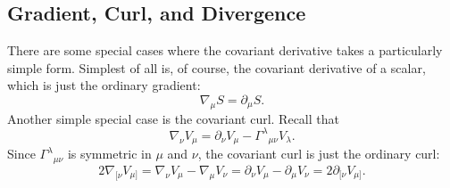 
\subsection{Gradient, Curl, and Divergence}\label{sec:4.7}

There are some special cases where the covariant derivative takes a
particularly simple form. Simplest of all is, of course, the covariant
derivative of a scalar, which is just the ordinary gradient:
\begin{equation}
  \nabla_\mu S=\partial_\mu S.
  \tag{4.7.1}\label{eq:4.7.1}
\end{equation}
Another simple special case is the covariant curl. Recall that
\[
  \nabla_\nu V_\mu
  =
  \partial_\nu V_\mu-\Gamma^\lambda{}_{\mu\nu}V_\lambda.
\]
Since \(\Gamma^\lambda{}_{\mu\nu}\) is symmetric in \(\mu\) and \(\nu\),
the covariant curl is just the ordinary curl:
\begin{equation}
  2\nabla_{[\nu}V_{\mu]}
  =
  \nabla_\nu V_\mu-\nabla_\mu V_\nu
  =
  \partial_\nu V_\mu-\partial_\mu V_\nu
  =
  2\partial_{[\nu}V_{\mu]}.
  \tag{4.7.2}\label{eq:4.7.2}
\end{equation}

